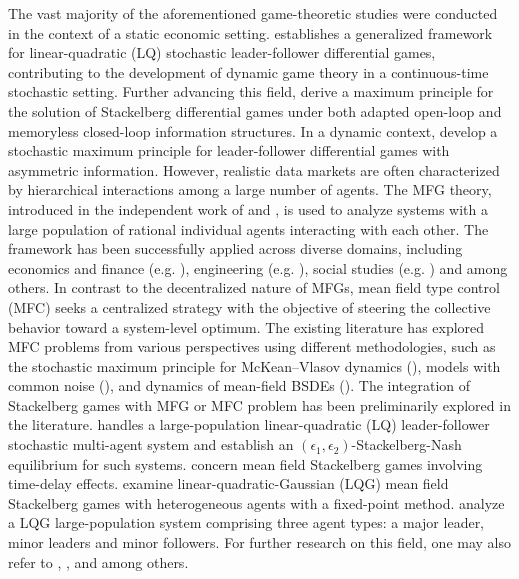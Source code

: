\documentclass[11pt]{article}
\numberwithin{equation}{section}
\begin{document}
The vast majority of the aforementioned game-theoretic studies were conducted in the context of a static economic setting. \cite{Y02} establishes a generalized framework for linear-quadratic (LQ) stochastic leader-follower differential games, contributing to the development of dynamic game theory in a continuous-time stochastic setting. Further advancing this field, \cite{BCS15} derive a maximum principle for the solution of Stackelberg differential games under both adapted open-loop and memoryless closed-loop information structures. In a dynamic context, \cite{SW16} develop a stochastic maximum principle for leader-follower differential games with asymmetric information. However, realistic data markets are often characterized by hierarchical interactions among a large number of agents. The MFG theory, introduced in the independent work of \cite{LL07} and \cite{HM06}, is used to analyze systems with a large population of rational individual agents interacting with each other. The framework has been successfully applied across diverse domains, including economics and finance (e.g. \cite{G16}), engineering (e.g. \cite{MC11}), social studies (e.g. \cite{BT16}) and among others. In contrast to the decentralized nature of MFGs, mean field type control (MFC) seeks a centralized strategy with the objective of steering the collective behavior toward a system-level optimum. The existing literature has explored MFC problems from various perspectives using different methodologies, such as the stochastic maximum principle for McKean–Vlasov dynamics (\cite{CD15}), models with common noise (\cite{G16}), and dynamics of mean-field BSDEs (\cite{LS19}). The integration of Stackelberg games with MFG or MFC problem has been preliminarily explored in the literature. \cite{NC12} handles a large-population linear-quadratic (LQ) leader-follower stochastic multi-agent system and establish an $(\epsilon_1, \epsilon_2)$-Stackelberg-Nash equilibrium for such systems. \cite{BC15, BC17} concern mean field Stackelberg games involving time-delay effects. \cite{MB18} examine linear-quadratic-Gaussian (LQG) mean field Stackelberg games with heterogeneous agents with a fixed-point method. \cite{HS21} analyze a LQG large-population system comprising three agent types: a major leader, minor leaders and minor followers. For further research on this field, one may also refer to \cite{LJ18},  \cite{FH20}, \cite{W25} and among others.
	
\end{document}
